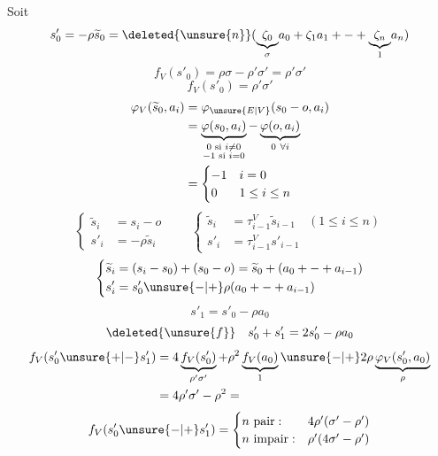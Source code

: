 Soit
\[
s'_0=-\rho\widetilde s_0=
\deleted{\unsure{n}}
(\underset{\sigma}{\underbrace{\zeta_0}}a_0+
\zeta_1a_1+\mathbin{-}+
\underset{1}{\underbrace{\zeta_n}}a_n)
\]
\[
f_V(s'_0)=\rho\sigma-\rho'\sigma'=\rho'\sigma'
\]
\[
\boxed{f_V(s'_0)=\rho'\sigma'}
\]
\[
\begin{aligned}
\varphi_V(\widetilde s_0,a_i)
&=\varphi_{\unsure{E|V}}(s_0-o,a_i)\\
&=\underbrace{\varphi(s_0,a_i)}_{\substack{0\text{ si }i\neq0\\-1\text{ si }i=0}}
-\underbrace{\varphi(o,a_i)}_{0\ \forall i}\\
&=\begin{cases}-1&i=0\\0&1\leq i\leq n\end{cases}
\end{aligned}
\]
\[
\left\{\begin{aligned}
\widetilde s_i&=s_i-o\\
s'_i&=-\rho\widetilde s_i
\end{aligned}\right.
\qquad
\left\{\begin{aligned}
\widetilde s_i&=\tau_{i-1}^V\widetilde s_{i-1}
\quad(1\leq i\leq n)\\
s'_i&=\tau_{i-1}^Vs'_{i-1}
\end{aligned}\right.
\]
\[
\left\{\begin{aligned}
\widetilde s_i&=(s_i-s_0)+(s_0-o)
=\widetilde s_0+(a_0+\mathbin{-}+a_{i-1})\\
s'_i&=s'_0\unsure{-|+}\rho(a_0+\mathbin{-}+a_{i-1})
\end{aligned}\right.
\]
\[
s'_1=s'_0-\rho a_0
\]
\[
\deleted{\unsure{f}}\quad s'_0+s'_1=2s'_0-\rho a_0
\]
\[
\begin{aligned}
f_V(s'_0\unsure{+|-}s'_1)
&=4\underbrace{f_V(s'_0)}_{\rho'\sigma'}
+\rho^2\underbrace{f_V(a_0)}_1
\unsure{-|+}2\rho\underbrace{\varphi_V(s'_0,a_0)}_\rho\\
&=4\rho'\sigma'-\rho^2=
\end{aligned}
\]
\[
f_V(s'_0\unsure{-|+}s'_1)=
\begin{cases}
n\text{ pair}:&4\rho'(\sigma'-\rho')\\
n\text{ impair}:&\rho'(4\sigma'-\rho')
\end{cases}
\]

